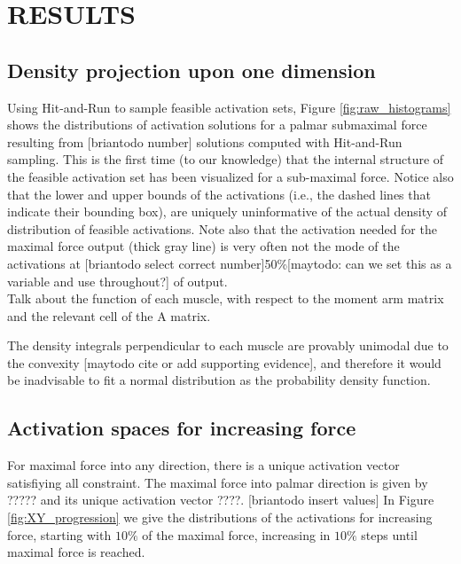 

\section{RESULTS}
\subsection{Density projection upon one dimension} %
\label{ssub:density_projection_upon_one_dimension}

Using Hit-and-Run to sample feasible activation sets, Figure \ref{fig:raw_histograms} shows the distributions of activation solutions for a palmar submaximal force resulting from [briantodo number] solutions computed with Hit-and-Run sampling. This is the first time (to our knowledge) that the internal structure of the feasible activation set has been visualized for a sub-maximal force.
Notice also that the lower and upper bounds of the activations (i.e., the dashed lines that indicate their bounding box), are uniquely uninformative of the actual density of distribution of feasible activations. Note also that the activation needed for the maximal force output (thick gray line) is very often not the mode of the activations at [briantodo select correct number]50\%[maytodo: can we set this as a variable and use throughout?] of output.
\\

Talk about the function of each muscle, with respect to the moment arm matrix and the relevant cell of the A matrix.

The density integrals perpendicular to each muscle are provably unimodal due to the convexity [maytodo cite or add supporting evidence], and therefore it would be inadvisable to fit a normal distribution as the probability density function.

\subsection{Activation spaces for increasing force} %
\label{sub:activation_spaces_for_increasing_force}
For maximal force into any direction, there is a unique activation vector satisfiying all constraint. The maximal force into palmar direction is given by ????? and its unique activation vector ????. [briantodo insert values]
In Figure \ref{fig:XY_progression} we give the distributions of the activations for increasing force, starting with $10\%$ of the maximal force, increasing in $10\%$ steps until maximal force is reached.

